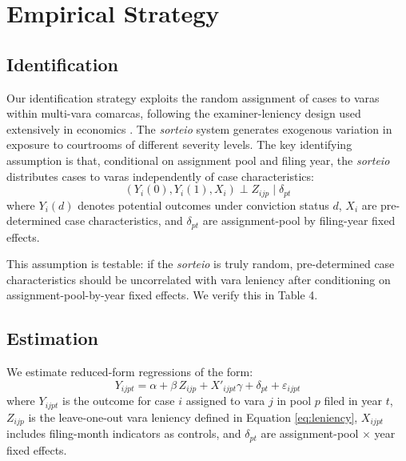 \documentclass[12pt]{article}
\begin{document}
\section{Empirical Strategy}

\subsection{Identification}

Our identification strategy exploits the random assignment of cases to varas within multi-vara comarcas, following the examiner-leniency design used extensively in economics \citep{kling2006, maestas2013, dahl2014, dobbie2018}. The \textit{sorteio} system generates exogenous variation in exposure to courtrooms of different severity levels. The key identifying assumption is that, conditional on assignment pool and filing year, the \textit{sorteio} distributes cases to varas independently of case characteristics:
\begin{equation}
(Y_i(0), Y_i(1), X_i) \perp Z_{ijp} \mid \delta_{pt}
\label{eq:independence}
\end{equation}
where $Y_i(d)$ denotes potential outcomes under conviction status $d$, $X_i$ are pre-determined case characteristics, and $\delta_{pt}$ are assignment-pool by filing-year fixed effects.

This assumption is testable: if the \textit{sorteio} is truly random, pre-determined case characteristics should be uncorrelated with vara leniency after conditioning on assignment-pool-by-year fixed effects. We verify this in Table 4.

\subsection{Estimation}

We estimate reduced-form regressions of the form:
\begin{equation}
Y_{ijpt} = \alpha + \beta\, Z_{ijp} + X'_{ijpt}\gamma + \delta_{pt} + \varepsilon_{ijpt}
\label{eq:reduced_form}
\end{equation}
where $Y_{ijpt}$ is the outcome for case $i$ assigned to vara $j$ in pool $p$ filed in year $t$, $Z_{ijp}$ is the leave-one-out vara leniency defined in Equation \eqref{eq:leniency}, $X_{ijpt}$ includes filing-month indicators as controls, and $\delta_{pt}$ are assignment-pool $\times$ year fixed effects.
\end{document}
